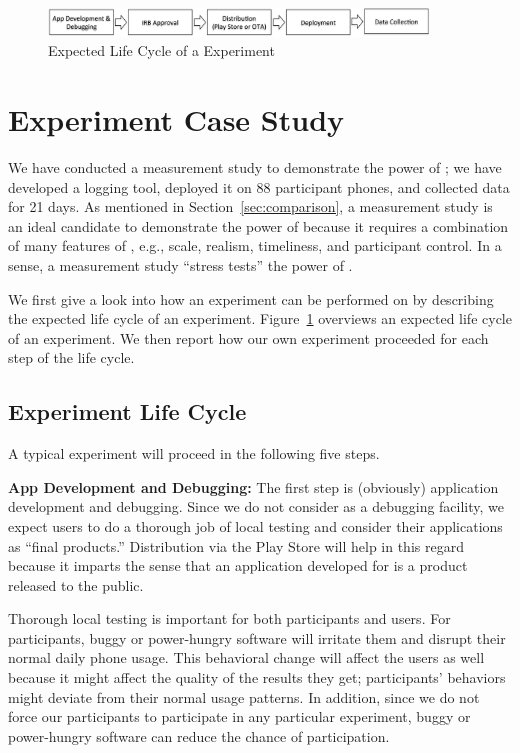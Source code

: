 \newpage

\begin{figure}[t]
\centering
\includegraphics[width=0.9\textwidth]{experiment-life-cycle.pdf}
\caption{Expected Life Cycle of a \PhoneLab{} Experiment}
\label{fig:experiment-life-cycle}
\end{figure}

\section{Experiment Case Study}
\label{sec-experiment}

We have conducted a measurement study to demonstrate the power of \PhoneLab{};
we have developed a logging tool, deployed it on 88 participant phones, and
collected data for 21 days. As mentioned in Section~\ref{sec:comparison}, 
a measurement study is an ideal candidate to demonstrate the power of
\PhoneLab{} because it requires a combination of many features of \PhoneLab{},
e.g., scale, realism, timeliness, and participant control. In a sense, a
measurement study ``stress tests'' the power of \PhoneLab{}.

We first give a look into how an experiment can be performed on \PhoneLab{} by
describing the expected life cycle of an experiment.
Figure~\ref{fig:experiment-life-cycle} overviews an expected life cycle of an
experiment. We then report how our own experiment proceeded for each step of the
life cycle.

\subsection{Experiment Life Cycle}

A typical \PhoneLab{} experiment will proceed in the following five steps.

{\bf App Development and Debugging:} The first step is (obviously) application
development and debugging. Since we do not consider \PhoneLab{} as a debugging
facility, we expect \PhoneLab{} users to do a thorough job of local testing and
consider their applications as ``final products.'' Distribution via the Play
Store will help in this regard because it imparts the sense that an application
developed for \PhoneLab{} is a product released to the public.

Thorough local testing is important for both \PhoneLab{} participants and users.
For participants, buggy or power-hungry software will irritate them and disrupt
their normal daily phone usage. This behavioral change will affect the users as
well because it might affect the quality of the results they get; participants'
behaviors might deviate from their normal usage patterns. In addition, since we
do not force our participants to participate in any particular experiment, buggy
or power-hungry software can reduce the chance of participation.

